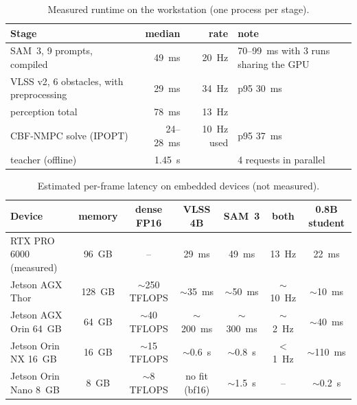 \documentclass[10pt,a4paper]{article}
\begin{document}
\begin{table}[htbp]
\centering\small
\caption{Measured runtime on the workstation (one process per stage).}
\label{tab:runtime}
\begin{tabular}{lrrl}
\toprule
Stage & median & rate & note \\
\midrule
SAM~3, 9 prompts, compiled & 49~ms & 20~Hz & 70--99~ms with 3 runs sharing the GPU \\
VLSS v2, 6 obstacles, with preprocessing & 29~ms & 34~Hz & p95 30~ms \\
perception total & 78~ms & 13~Hz & \\
CBF-NMPC solve (IPOPT) & 24--28~ms & 10~Hz used & p95 37~ms \\
teacher (offline) & 1.45~s & & 4 requests in parallel \\
\bottomrule
\end{tabular}
\end{table}

\begin{table}[htbp]
\centering\small
\caption{Estimated per-frame latency on embedded devices (not measured).}
\label{tab:jetson}
\begin{tabular}{lcccccc}
\toprule
Device & memory & dense FP16 & VLSS 4B & SAM~3 & both & 0.8B student \\
\midrule
RTX PRO 6000 (measured) & 96~GB & -- & 29~ms & 49~ms & 13~Hz & 22~ms \\
Jetson AGX Thor & 128~GB & $\sim$250 TFLOPS & $\sim$35~ms & $\sim$50~ms & $\sim$10~Hz & $\sim$10~ms \\
Jetson AGX Orin 64~GB & 64~GB & $\sim$40 TFLOPS & $\sim$200~ms & $\sim$300~ms & $\sim$2~Hz & $\sim$40~ms \\
Jetson Orin NX 16~GB & 16~GB & $\sim$15 TFLOPS & $\sim$0.6~s & $\sim$0.8~s & $<$1~Hz & $\sim$110~ms \\
Jetson Orin Nano 8~GB & 8~GB & $\sim$8 TFLOPS & no fit (bf16) & $\sim$1.5~s & -- & $\sim$0.2~s \\
\bottomrule
\end{tabular}
\end{table}

\end{document}
